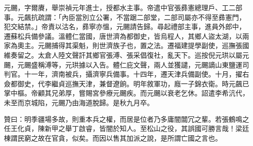 \begin{pinyinscope}
元颺，字爾賡，舉崇禎元年進士，授都水主事。帝遣中官張彞憲總理戶、工二部事。元飆抗疏謂：「內臣當別立公署，不當踞二部堂，二部司屬亦不得至彞憲門，犯交結禁。」帝責以沽名，彞寧亦慍，元颺請告歸。尋起禮部主事，進員外郎中，遷蘇松兵備參議。溫體仁當國，唐世濟為都御史，皆烏程人，其鄉人盜太湖，以兩家為奧主。元颺捕得其渠魁，則世濟族子也，置之法。遷福建提學副使，巡撫張國維奏留之。太倉人陸文聲訐其鄉官張溥、張采倡復社，亂天下。巡按倪元珙以屬元颺，元颺盛稱溥等，元珙據以入告。體仁庇文聲，兩人並獲譴，元颺謫山東鹽運司判官。十一年，濟南被兵，攝濟寧兵備事。十四年，遷天津兵備副使。十月，擢右僉都御史，代李繼貞巡撫天津，兼督遼餉。明年敘軍功，廕一子錦衣衛。時元飆已掌中樞。帝顧其兄弟厚，嘗賜宮參療元颺疾。而元颺以衰老乞休。詔遣李希沆代，未至而京城陷，元颺乃由海道脫歸。是秋九月卒。

贊曰：明季疆場多故，則重本兵之權，而居是位者乃多庸闇闒冗之輩。若張鶴鳴之任王化貞，陳新甲之舉丁啟睿，皆闇於知人。至松山之役，其誤國可勝言哉！梁廷棟謂民窮之故在官貪，似矣。而因以售其加派之說，是所謂亡國之言也。


\end{pinyinscope}